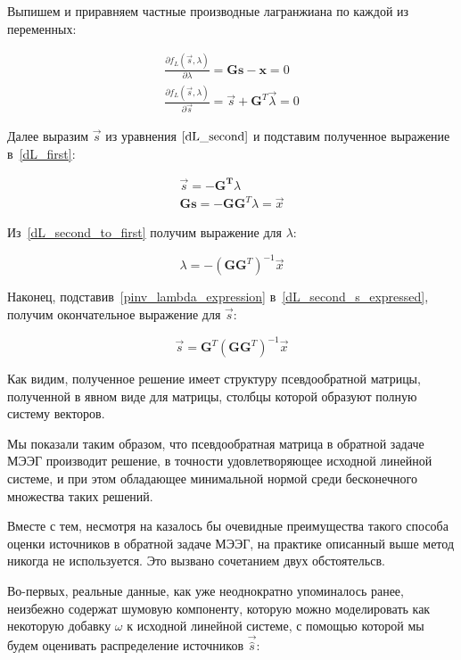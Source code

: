 Выпишем и приравняем частные производные лагранжиана по каждой из переменных:

\begin{gather}
    \frac{\partial f_L(\vec{s}, \lambda)}{\partial \lambda} = \mathbf{Gs - x} = 0
    \label{dL_first} \\
    \frac{\partial f_L(\vec{s}, \lambda)}{\partial \vec{s}} = \vec{s}
    + \mathbf{G}^T\vec{\lambda} = 0
    \label{dL_second}
\end{gather}

Далее выразим $\vec{s}$ из уравнения $\ref{dL_second}$ и подставим
полученное выражение в~\ref{dL_first}:

\begin{gather}
    \vec{s} = - \mathbf{G^T}\lambda
    \label{dL_second_s_expressed}\\
    \mathbf{Gs} = - \mathbf{G} \mathbf{G}^T\lambda = \vec{x}
    \label{dL_second_to_first}
\end{gather}

Из~\ref{dL_second_to_first} получим выражение для $\lambda$:

\begin{equation}
    \lambda = - {(\mathbf{G}\mathbf{G}^T)}^{-1}\vec{x}
    \label{pinv_lambda_expression}
\end{equation}

Наконец, подставив~\ref{pinv_lambda_expression} в~\ref{dL_second_s_expressed}, получим
окончательное выражение для $\vec{s}$:

\begin{equation}
    \vec{s} = \mathbf{G}^T{(\mathbf{GG}^T)}^{-1}\vec{x}
\end{equation}

Как видим, полученное решение имеет структуру псевдообратной матрицы,
полученной в явном виде для матрицы, столбцы которой образуют полную систему
векторов.

Мы показали таким образом, что псевдообратная матрица в обратной задаче МЭЭГ
производит решение, в точности удовлетворяющее исходной линейной системе, и при
этом обладающее минимальной нормой среди бесконечного множества таких решений.

Вместе с тем, несмотря на казалось бы очевидные преимущества такого способа
оценки источников в обратной задаче МЭЭГ, на практике описанный выше метод
никогда не используется. Это вызвано сочетанием двух обстоятельсв. 

Во-первых, реальные данные, как уже неоднократно упоминалось ранее, неизбежно
содержат шумовую компоненту, которую можно моделировать как некоторую добавку
$\omega$ к исходной линейной системе, с помощью которой мы будем оценивать
распределение источников $\vec{\hat{s}}$:

